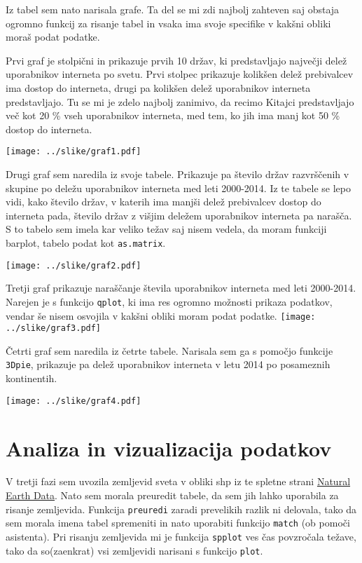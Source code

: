 \documentclass[11pt,a4paper]{article}
\begin{document}
Iz tabel sem nato narisala grafe. Ta del se mi zdi najbolj zahteven saj obstaja ogromno funkcij za risanje tabel in vsaka ima svoje specifike v kakšni obliki moraš podat podatke.

Prvi graf je stolpični in prikazuje prvih 10 držav, ki predstavljajo največji delež uporabnikov interneta po svetu. Prvi stolpec prikazuje kolikšen delež prebivalcev ima dostop do interneta, drugi pa kolikšen delež uporabnikov interneta predstavljajo. Tu se mi je zdelo najbolj zanimivo, da recimo Kitajci predstavljajo več kot 20 \% vseh uporabnikov interneta, med tem, ko jih ima manj kot 50 \% dostop do interneta.

\texttt{[image: ../slike/graf1.pdf]}

\newpage
Drugi graf sem naredila iz svoje tabele. Prikazuje pa število držav razvrščenih v skupine po deležu uporabnikov interneta med leti 2000-2014. Iz te tabele se lepo vidi, kako število držav, v katerih ima manjši delež prebivalcev dostop do interneta pada, število držav z višjim deležem uporabnikov interneta pa narašča.
S to tabelo sem imela kar veliko težav saj nisem vedela, da moram funkciji barplot, tabelo podat kot \verb|as.matrix|.

\texttt{[image: ../slike/graf2.pdf]}

\newpage
Tretji graf prikazuje naraščanje števila uporabnikov interneta med leti 2000-2014. Narejen je s funkcijo \verb|qplot|, ki ima res ogromno možnosti prikaza podatkov, vendar še nisem osvojila v kakšni obliki moram podat podatke. 
\-
\texttt{[image: ../slike/graf3.pdf]}

Četrti graf sem naredila iz četrte tabele. Narisala sem ga s pomočjo funkcije \verb|3Dpie|, prikazuje pa delež uporabnikov interneta v letu 2014 po posameznih kontinentih.

\texttt{[image: ../slike/graf4.pdf]}

\newpage


\section{Analiza in vizualizacija podatkov}
V tretji fazi sem uvozila zemljevid sveta v obliki shp iz te spletne strani \href{http://www.naturalearthdata.com/http//www.naturalearthdata.com/download/50m/cultural/ne_50m_admin_0_countries.zip}{Natural Earth Data}. Nato sem morala preuredit tabele, da sem jih lahko uporabila za risanje zemljevida. Funkcija \verb|preuredi| zaradi prevelikih razlik ni delovala, tako da sem morala imena tabel spremeniti in nato uporabiti funkcijo \verb|match| (ob pomoči asistenta). Pri risanju zemljevida mi je funkcija \verb|spplot| ves čas povzročala težave, tako da so(zaenkrat) vsi zemljevidi narisani s funkcijo \verb|plot|. 
\end{document}
